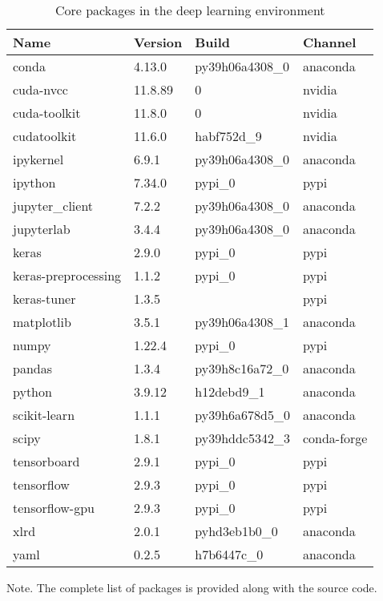 \begin{table}[h]
  \centering
  \begin{tabular}{l l l l}
    \hline
    Name                & Version & Build          & Channel     \\
    \hline
    conda               & 4.13.0  & py39h06a4308_0 & anaconda    \\
    cuda-nvcc           & 11.8.89 & 0              & nvidia      \\
    cuda-toolkit        & 11.8.0  & 0              & nvidia      \\
    cudatoolkit         & 11.6.0  & habf752d_9     & nvidia      \\
    ipykernel           & 6.9.1   & py39h06a4308_0 & anaconda    \\
    ipython             & 7.34.0  & pypi_0         & pypi        \\
    jupyter\_client     & 7.2.2   & py39h06a4308_0 & anaconda    \\
    jupyterlab          & 3.4.4   & py39h06a4308_0 & anaconda    \\
    keras               & 2.9.0   & pypi_0         & pypi        \\
    keras-preprocessing & 1.1.2   & pypi_0         & pypi        \\
    keras-tuner         & 1.3.5   &                & pypi        \\
    matplotlib          & 3.5.1   & py39h06a4308_1 & anaconda    \\
    numpy               & 1.22.4  & pypi_0         & pypi        \\
    pandas              & 1.3.4   & py39h8c16a72_0 & anaconda    \\
    python              & 3.9.12  & h12debd9_1     & anaconda    \\
    scikit-learn        & 1.1.1   & py39h6a678d5_0 & anaconda    \\
    scipy               & 1.8.1   & py39hddc5342_3 & conda-forge \\
    tensorboard         & 2.9.1   & pypi_0         & pypi        \\
    tensorflow          & 2.9.3   & pypi_0         & pypi        \\
    tensorflow-gpu      & 2.9.3   & pypi_0         & pypi        \\
    xlrd                & 2.0.1   & pyhd3eb1b0_0   & anaconda    \\
    yaml                & 0.2.5   & h7b6447c_0     & anaconda    \\
    \hline
  \end{tabular}
  \caption{Core packages in the deep learning environment}
  \label{si_table19}
\end{table}
Note. The complete list of packages is provided along with the source code.



